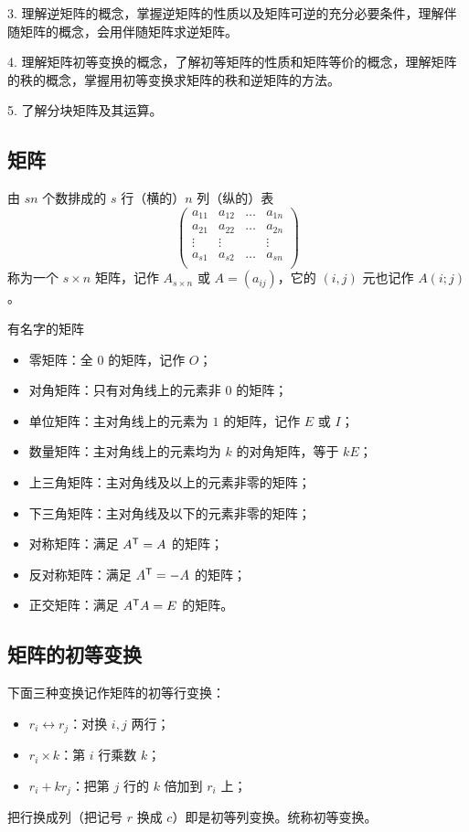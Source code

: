 3. 理解逆矩阵的概念，掌握逆矩阵的性质以及矩阵可逆的充分必要条件，理解伴随矩阵的概念，会用伴随矩阵求逆矩阵。

4. 理解矩阵初等变换的概念，了解初等矩阵的性质和矩阵等价的概念，理解矩阵的秩的概念，掌握用初等变换求矩阵的秩和逆矩阵的方法。

5. 了解分块矩阵及其运算。

\subsection{矩阵}

由 $sn$ 个数排成的 $s$ 行（横的）$n$ 列（纵的）表
\[ \left(
	\begin{matrix}
			a_{11} & a_{12} & \ldots & a_{1n} \\
			a_{21} & a_{22} & \ldots & a_{2n} \\
			\vdots & \vdots &        & \vdots \\a_{s1}&a_{s2}&\ldots&a_{sn}\\
		\end{matrix}
	\right) \]
称为一个 $s\times n$ 矩阵，记作 $A_{s\times n}$ 或 $A=(a_{ij})$，它的 $(i,j)$ 元也记作 $A(i;j)$。

有名字的矩阵
\begin{itemize}
	\item 零矩阵：全 $0$ 的矩阵，记作 $O$；
	\item 对角矩阵：只有对角线上的元素非 $0$ 的矩阵；
	\item 单位矩阵：主对角线上的元素为 $1$ 的矩阵，记作 $E$ 或 $I$；
	\item 数量矩阵：主对角线上的元素均为 $k$ 的对角矩阵，等于 $kE$；
	\item 上三角矩阵：主对角线及以上的元素非零的矩阵；
	\item 下三角矩阵：主对角线及以下的元素非零的矩阵；
	\item 对称矩阵：满足 ${A}^\mathsf{T} = A$ 的矩阵；
	\item 反对称矩阵：满足 ${A}^\mathsf{T} = -A$ 的矩阵；
	\item 正交矩阵：满足 ${A}^\mathsf{T}A=E$ 的矩阵。
\end{itemize}

\subsection{矩阵的初等变换}

下面三种变换记作矩阵的初等行变换：
\begin{itemize}
	\item $r_i \leftrightarrow r_j$：对换 $i, j$ 两行；
	\item $r_i \times k$：第 $i$ 行乘数 $k$；
	\item $r_i + kr_j$：把第 $j$ 行的 $k$ 倍加到 $r_i$ 上；
\end{itemize}
把行换成列（把记号 $r$ 换成 $c$）即是初等列变换。统称初等变换。


